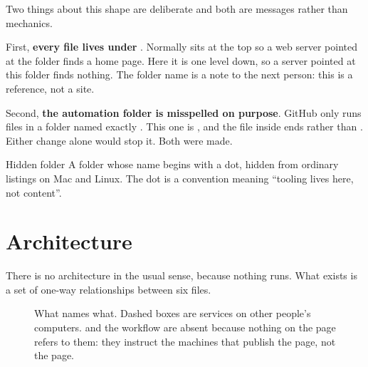 \documentclass[11pt,a4paper]{article}
\begin{document}
Two things about this shape are deliberate and both are messages rather than
mechanics.

First, \textbf{every file lives under }. Normally
 sits at the top so a web server pointed at the folder finds a
home page. Here it is one level down, so a server pointed at this folder finds
nothing. The folder name is a note to the next person: this is a reference, not a
site.

Second, \textbf{the automation folder is misspelled on purpose}. GitHub only runs
files in a folder named exactly . This one is
, and the file inside ends 
rather than . Either change alone would stop it. Both were made.

\begin{jargon}{Hidden folder}
A folder whose name begins with a dot, hidden from ordinary listings on Mac and
Linux. The dot is a convention meaning ``tooling lives here, not content''.
\end{jargon}

\section{Architecture}

There is no architecture in the usual sense, because nothing runs. What exists is
a set of one-way relationships between six files.

\begin{figure}[H]\centering
{}
\caption{What names what. Dashed boxes are services on other people's computers.
 and the workflow are absent because nothing on the page refers
to them: they instruct the machines that publish the page, not the page.}
\end{figure}
\end{document}
